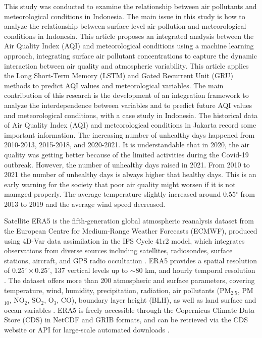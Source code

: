 \documentclass[pdflatex,sn-mathphys-num]{sn-jnl}%
\theoremstyle{thmstyleone}%
\theoremstyle{thmstyletwo}%
\theoremstyle{thmstylethree}%
\begin{document}
	This study was conducted to examine the relationship between air pollutants and meteorological conditions in Indonesia. The main issue in this study is how to analyze the relationship between surface-level air pollution and meteorological conditions in Indonesia. This article proposes an integrated analysis between the Air Quality Index (AQI) and meteorological conditions using a machine learning approach, integrating surface air pollutant concentrations to capture the dynamic interaction between air quality and atmospheric variability. This article applies the Long Short-Term Memory (LSTM) and Gated Recurrent Unit (GRU) methods to predict AQI values and meteorological variables. The main contribution of this research is the development of an integration framework to analyze the interdependence between variables and to predict future AQI values and meteorological conditions, with a case study in Indonesia.
	The historical data of Air Quality Index (AQI) and meteorological conditions in Jakarta record some important information. The increasing number of unhealthy days happened from 2010-2013, 2015-2018, and 2020-2021. It is understandable that in 2020, the air quality was getting better because of the limited activities during the Covid-19 outbreak. However, the number of unhealthy days raised in 2021. From 2010 to 2021 the number of unhealthy days is always higher that healthy days. This is an early warning for the society that poor air quality might worsen if it is not managed properly. The average temperature slightly increased around 0.55$^\circ$ from 2013 to 2019 and the average wind speed decreased.

Satellite
ERA5 is the fifth-generation global atmospheric reanalysis dataset from the 
European Centre for Medium-Range Weather Forecasts (ECMWF), produced using 
4D-Var data assimilation in the IFS Cycle 41r2 model, which integrates 
observations from diverse sources including satellites, radiosondes, surface 
stations, aircraft, and GPS radio occultation \cite{hersbach2020, copernicus2023}. 
ERA5 provides a spatial resolution of $0.25^\circ \times 0.25^\circ$, 137 
vertical levels up to $\sim$80 km, and hourly temporal resolution \cite{hersbach2020}. 
The dataset offers more than 200 atmospheric and surface parameters, covering 
temperature, wind, humidity, precipitation, radiation, air pollutants 
(PM$_{2.5}$, PM$_{10}$, NO$_2$, SO$_2$, O$_3$, CO), 
boundary layer height (BLH), as well as land surface and ocean variables 
\cite{hersbach2020, bell2021}. ERA5 is freely accessible through the Copernicus 
Climate Data Store (CDS) in NetCDF and GRIB formats, and can be retrieved via 
the CDS website or API for large-scale automated downloads \cite{copernicus2023}.
\end{document}
